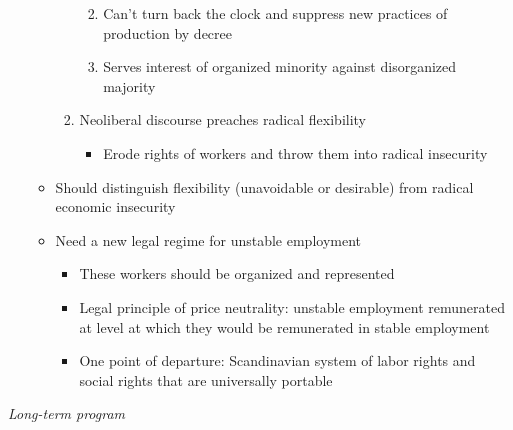 \begin{itemize}
\begin{enumerate}
\begin{enumerate}
      \begin{enumerate}
      \def\labelenumiii{\arabic{enumiii}.}
      \tightlist
      \item
        Can't turn back the clock and suppress new practices of
        production by decree
      \item
        Serves interest of organized minority against disorganized
        majority
      \end{enumerate}
    \item
      Neoliberal discourse preaches radical flexibility

      \begin{itemize}
      \tightlist
      \item
        Erode rights of workers and throw them into radical insecurity
      \end{itemize}
    \end{enumerate}
  \end{enumerate}

  \begin{itemize}
  \tightlist
  \item
    Should distinguish flexibility (unavoidable or desirable) from
    radical economic insecurity
  \item
    Need a new legal regime for unstable employment

    \begin{itemize}
    \tightlist
    \item
      These workers should be organized and represented
    \item
      Legal principle of price neutrality: unstable employment
      remunerated at level at which they would be remunerated in stable
      employment
    \item
      One point of departure: Scandinavian system of labor rights and
      social rights that are universally portable
    \end{itemize}
  \end{itemize}
\end{itemize}

\emph{Long-term program}

